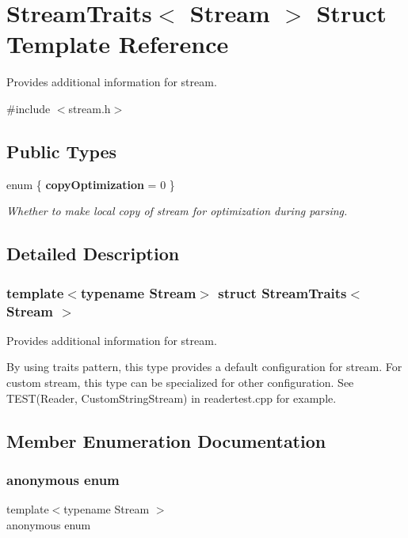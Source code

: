 \hypertarget{struct_stream_traits}{}\section{Stream\+Traits$<$ Stream $>$ Struct Template Reference}
\label{struct_stream_traits}


Provides additional information for stream.  




{\ttfamily \#include $<$stream.\+h$>$}

\subsection*{Public Types}
\begin{DoxyCompactItemize}
\item 
enum \{ {\bfseries copy\+Optimization} = 0
 \}\begin{DoxyCompactList}\small\item\em Whether to make local copy of stream for optimization during parsing. \end{DoxyCompactList}
\end{DoxyCompactItemize}


\subsection{Detailed Description}
\subsubsection*{template$<$typename Stream$>$\newline
struct Stream\+Traits$<$ Stream $>$}

Provides additional information for stream. 

By using traits pattern, this type provides a default configuration for stream. For custom stream, this type can be specialized for other configuration. See T\+E\+S\+T(\+Reader, Custom\+String\+Stream) in readertest.\+cpp for example. 

\subsection{Member Enumeration Documentation}
\mbox{\label{struct_stream_traits_a6b076e3cff8a8c00ee76c453c5044fc0}} 
\subsubsection{\texorpdfstring{anonymous enum}{anonymous enum}}
{\footnotesize\ttfamily template$<$typename Stream $>$ \\
anonymous enum}



